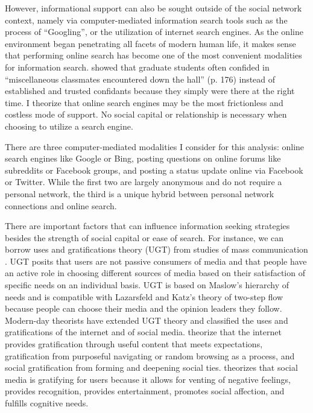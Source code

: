 However, informational support can also be sought outside of the social network
context, namely via computer-mediated information search tools such as the
process of ``Googling'', or the utilization of internet search engines. As the
online environment began penetrating all facets of modern human life, it makes
sense that performing online search has become one of the most convenient
modalities for information search. \citet{smallSomeoneTalk2017} showed
that graduate students often confided in ``miscellaneous classmates encountered
down the hall'' (p. 176) instead of established and trusted confidants because
they simply were there at the right time.
I theorize that online search engines
may be the most frictionless and costless mode of support. No social capital or
relationship is necessary when choosing to utilize a search engine.

There are three computer-mediated modalities I consider for this analysis: online
search engines like Google or Bing, posting questions on online forums like
subreddits or Facebook groups, and posting a status update online via Facebook
or Twitter. While the first two are largely anonymous and do not require a
personal network, the third is a unique hybrid between personal network
connections and online search.

There are important factors that can influence information seeking strategies
besides the strength of social capital or ease of search. For instance, we can
borrow uses and gratifications theory (UGT) from studies of mass communication
\citep{blumlerUsesMassCommunications1974, tanMassCommunicationTheories1985}. UGT
posits that users are not passive consumers of media and that people have an
active role in choosing different sources of media based on their satisfaction
of specific needs on an individual basis. UGT is based on Maslow’s
\citeyear{maslowTheoryHumanMotivation1943} hierarchy of needs and is compatible
with Lazarsfeld and Katz’s theory of two-step flow
\citep{katzPersonalInfluencePart1955} because people can choose their media and
the opinion leaders they follow. Modern-day theorists have extended UGT theory
and classified the uses and gratifications of the internet and of social media.
\citet{staffordDeterminingUsesGratifications2004} theorize that the internet
provides gratification through useful content that meets expectations,
gratification from purposeful navigating or random browsing as a process, and
social gratification from forming and deepening social ties.
\citet{leungGenerationalDifferencesContent2013} theorizes that social media is
gratifying for users because it allows for venting of negative feelings,
provides recognition, provides entertainment, promotes social affection, and
fulfills cognitive needs.

